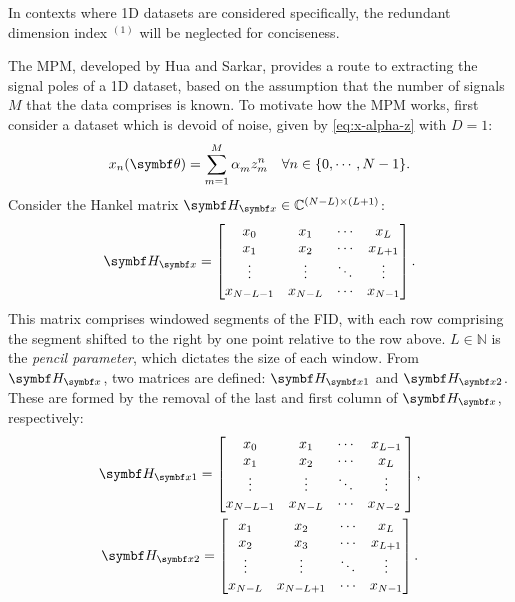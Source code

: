 \begin{remark}
    In contexts where \ac{1D} datasets are considered specifically, the
    redundant dimension index $^{(1)}$ will be neglected for conciseness.
\end{remark}
The \ac{MPM}, developed by Hua and Sarkar\cite{Hua1990,Hua1990b,Hua1991},
provides a route to extracting the signal poles of a \ac{1D} dataset, based on
the assumption that the number of signals $M$ that the data comprises is known.
To motivate how the \ac{MPM} works, first consider a dataset which is devoid of
noise, given by \cref{eq:x-alpha-z} with $D=1$:
\begin{equation}
    x_n(\bth) = \sumM \alpha_m^{\vphantom{n}} z_m^n
    \quad \forall n \in \lbrace 0, \cdots, N-1 \rbrace.
\end{equation}
Consider the Hankel matrix $\Hx \in \mathbb{C}^{(N-L) \times (L+1)}$:
\begin{equation}
    \Hx =
    \begin{bmatrix}
        x_0 & x_1 & \cdots & x_L\\
        x_1 & x_2 & \cdots & x_{L+1}\\
        \vdots & \vdots & \ddots & \vdots\\
        x_{N-L-1} & x_{N-L} & \cdots & x_{N-1}
    \end{bmatrix}.
\end{equation}
This matrix comprises windowed segments of the FID, with each row comprising
the segment shifted to the right by one point relative to the row above.
$L \in \mathbb{N}$ is the \emph{pencil parameter}, which dictates the size of
each window. From $\Hx$, two matrices are defined: $\Hxone$ and $\Hxtwo$.
These are formed by the removal of the last and first column of $\Hx$,
respectively:
\begin{subequations}
   \begin{gather}
        \Hxone =
        \begin{bmatrix}
            x_0 & x_1 & \cdots & x_{L-1} \\
            x_{1} & x_{2} & \cdots & x_{L} \\
            \vdots & \vdots & \ddots & \vdots\\
            x_{N-L-1} & x_{N-L} & \cdots & x_{N-2}\
        \end{bmatrix}, \\
        \Hxtwo =
        \begin{bmatrix}
            x_{1} & x_{2} & \cdots & x_{L} \\
            x_{2} & x_{3} & \cdots & x_{L+1} \\
            \vdots & \vdots & \ddots & \vdots\\
            x_{N-L} & x_{N-L+1} & \cdots & x_{N-1}\\
        \end{bmatrix}.
   \end{gather}
\end{subequations}
